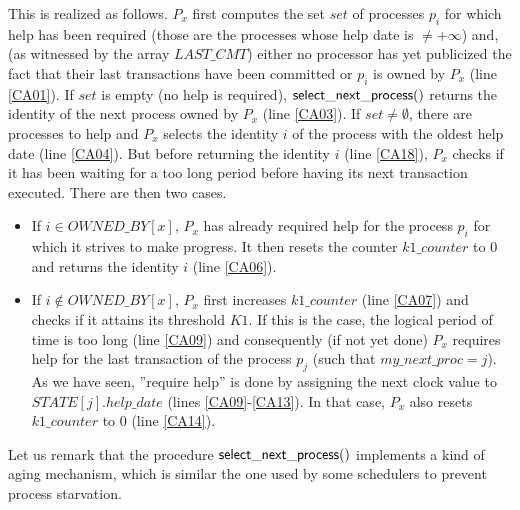 This is realized as follows. $P_x$ first computes the set $set$ of 
processes $p_i$ for which help has been required (those are the processes
 whose help date is $\neq +\infty$) and, (as witnessed by the array 
$\mathit{LAST\_CMT}$) either no processor has yet publicized the fact that
their last transactions have been committed  or $p_i$ is owned by $P_x$
(line  \ref{CA01}). 
If $set$ is empty (no help is required),  ${\sf select\_next\_process}()$
returns the identity of the next process owned by $P_x$ (line \ref{CA03}). 
If $set\neq \emptyset$, there are processes to help and $P_x$ selects the
identity $i$ of the process with the oldest help date  (line \ref{CA04}).  
But before returning the identity $i$ (line \ref{CA18}), $P_x$ 
checks if it has been  waiting for a too long period before having its next 
transaction executed.  There are then two cases. 
%
\begin{itemize}
\item 
If $i \in \mathit{OWNED\_BY}[x]$,  $P_x$ has already required 
help for the process $p_i$ for which it strives to make progress. 
It then resets the counter $k1\_counter$ to $0$
and returns the identity $i$  (line \ref{CA06}). 
%
\item 
If $i \notin \mathit{OWNED\_BY}[x]$, $P_x$ first increases  $k1\_counter$ 
(line \ref{CA07}) and  checks if it  attains its threshold $K1$. If this is 
the case, the logical period of time is too long  (line \ref{CA09}) and  
consequently (if not yet done) $P_x$ requires help for the last 
transaction of the process $p_j$ (such that $my\_next\_proc=j$).
As we have seen, ''require help'' is done by 
assigning the next clock value to $\mathit{STATE}[j].help\_date$  
(lines \ref{CA09}-\ref{CA13}). In that case,  $P_x$  also  resets  
$k1\_counter$ to $0$  (line \ref{CA14}). 
\end{itemize}


Let us remark that the  procedure  ${\sf  select\_next\_process}()$ 
implements a kind of aging mechanism, which is  similar the one used by 
some   schedulers  to prevent process  starvation. 



